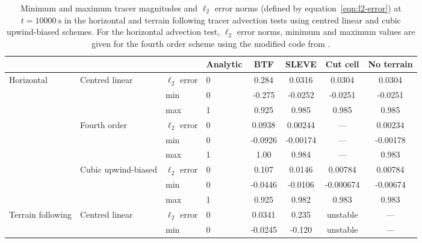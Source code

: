 \documentclass[draft]{ametsoc}
\begin{document}
\begin{table*}
	\caption{Minimum and maximum tracer magnitudes and \(\ell_2\) error norms (defined by equation~\ref{eqn:l2-error}) at \(t = \SI{10000}{\second}\) in the horizontal and terrain following tracer advection tests using centred linear and cubic upwind-biased schemes.  For the horizontal advection test, \(\ell_2\) error norms, minimum and maximum values are given for the fourth order scheme using the modified code from \citet{schaer2002}.}
\label{tab:advection}
%
\centering
\footnotesize
\begin{tabular}{l l l l S S S S}
\hline\hline
                  &                     &                  & Analytic & {BTF}   & {SLEVE}         & {Cut cell}     & {No terrain} \\
\hline
Horizontal        & Centred linear      & \(\ell_2\) error & 0        & 0.284   & 0.0316          & 0.0304         & 0.0304      \\
                  &                     & min              & 0        & -0.275  & -0.0252         & -0.0251        & -0.0251     \\
                  &                     & max              & 1        & 0.925   & 0.985           & 0.985          & 0.985       \\
                  & Fourth order        & \(\ell_2\) error & 0        & 0.0938  & 0.00244         & {---}          & 0.00234     \\
                  &                     & min              & 0        & -0.0926 & -0.00174        & {---}          & -0.00178    \\
                  &                     & max              & 1        & 1.00    & 0.984           & {---}          & 0.983       \\
                  & Cubic upwind-biased & \(\ell_2\) error & 0        & 0.107   & 0.0146          & 0.00784        & 0.00784     \\
                  &                     & min              & 0        & -0.0446 & -0.0106         & -0.000674      & -0.00674    \\
                  &                     & max              & 1        & 0.925   & 0.982           & 0.983          & 0.983       \\
\hline
Terrain following & Centred linear      & \(\ell_2\) error & 0        & 0.0341  & 0.235           & {unstable}     & {---}        \\
	          &                     & min              & 0        & -0.0245 & -0.120          & {unstable}     & {---}        \\

\end{tabular}
\end{table*}
\end{document}
